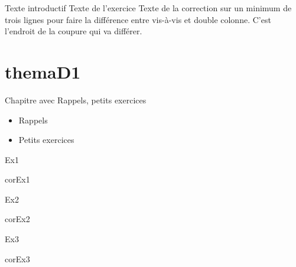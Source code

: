 \documentclass[nocrop]{sesamanuel}
\begin{document}
  \cours  
  \begin{methode}
    Texte introductif
    \exercice
    Texte de l’exercice
    \correction
    Texte de la correction sur un minimum de trois lignes pour faire la
    différence entre vis-à-vis et double colonne. C’est l’endroit de la
    coupure qui va différer.
  \end{methode}

\themaD


\chapter{themaD1}
\begin{prerequis}[Prérequis - D1]
  Chapitre avec Rappels, petits exercices
  \begin{itemize}
  \item Rappels
  \item Petits exercices
  \end{itemize}
\end{prerequis}

\begin{autoeval}
  \begin{multicols}{2}
    \begin{exercice}
      Ex1
    \end{exercice}
    \begin{corrige}
      corEx1
    \end{corrige}
    \begin{exercice}
      Ex2
    \end{exercice}
    \begin{corrige}
      corEx2
    \end{corrige}
\vfill \columnbreak
    \begin{exercice}
      Ex3
    \end{exercice}
    \begin{corrige}
      corEx3
    \end{corrige}
  \end{multicols}
\end{autoeval}

\end{document}
